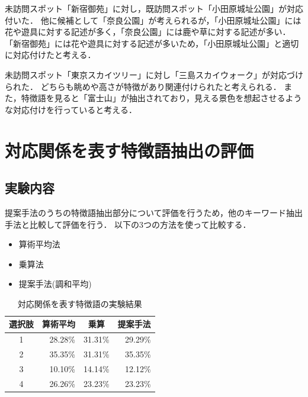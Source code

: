 \documentclass[submit]{ipsj}
\begin{document}
未訪問スポット「新宿御苑」に対し，既訪問スポット「小田原城址公園」が対応付いた．
他に候補として「奈良公園」が考えられるが，「小田原城址公園」には花や遊具に対する記述が多く，「奈良公園」には鹿や草に対する記述が多い．
「新宿御苑」には花や遊具に対する記述が多いため，「小田原城址公園」と適切に対応付けたと考える．

未訪問スポット「東京スカイツリー」に対し「三島スカイウォーク」が対応づけられた．
どちらも眺めや高さが特徴があり関連付けられたと考えられる．
また，特徴語を見ると「富士山」が抽出されており，見える景色を想起させるような対応付けを行っていると考える．

\section{対応関係を表す特徴語抽出の評価}
\label{sec:対応関係を表す特徴語抽出の評価}
\subsection{実験内容}
提案手法のうちの特徴語抽出部分について評価を行うため，他のキーワード抽出手法と比較して評価を行う．
以下の3つの方法を使って比較する．
\begin{itemize}
  \item 算術平均法
  \item 乗算法
  \item 提案手法(調和平均)
\end{itemize}

\begin{table}[t]
  \caption{対応関係を表す特徴語の実験結果}
  \label{table:対応関係を表す特徴語の実験結果}
  \centering
  \begin{tabular}{c|r|r|r}
  \hline
  選択肢 & \multicolumn{1}{c|}{算術平均} & \multicolumn{1}{c|}{乗算} & \multicolumn{1}{c}{提案手法} \\ \hline
  1  & 28.28\%                  & 31.31\%                  & 29.29\%                 \\
  2  & 35.35\%                  & 31.31\%                  & 35.35\%                 \\
  3  & 10.10\%                   & 14.14\%                  & 12.12\%                 \\
  4  & 26.26\%                  & 23.23\%                  & 23.23\%                 \\ \hline
  \end{tabular}
\end{table}
\end{document}
